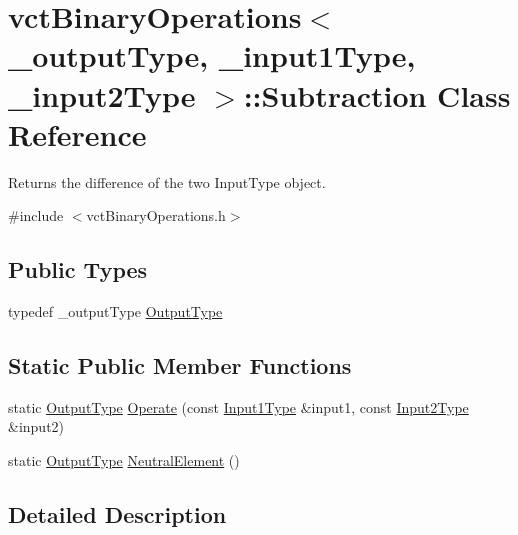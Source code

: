\hypertarget{classvct_binary_operations_1_1_subtraction}{}\section{vct\+Binary\+Operations$<$ \+\_\+output\+Type, \+\_\+input1\+Type, \+\_\+input2\+Type $>$\+:\+:Subtraction Class Reference}
\label{classvct_binary_operations_1_1_subtraction}


Returns the difference of the two Input\+Type object.  




{\ttfamily \#include $<$vct\+Binary\+Operations.\+h$>$}

\subsection*{Public Types}
\begin{DoxyCompactItemize}
\item 
typedef \+\_\+output\+Type \hyperlink{classvct_binary_operations_1_1_subtraction_acdf0aa04f6b08e9b6d199035f89071ff}{Output\+Type}
\end{DoxyCompactItemize}
\subsection*{Static Public Member Functions}
\begin{DoxyCompactItemize}
\item 
static \hyperlink{classvct_binary_operations_1_1_subtraction_acdf0aa04f6b08e9b6d199035f89071ff}{Output\+Type} \hyperlink{classvct_binary_operations_1_1_subtraction_a264fe1bd3f777894e0a50cf145b2df6d}{Operate} (const \hyperlink{classvct_binary_operations_a5e56a66a012d6a28c539a08a0021c45e}{Input1\+Type} \&input1, const \hyperlink{classvct_binary_operations_a929119af557a04a16b4d854981e49e1b}{Input2\+Type} \&input2)
\item 
static \hyperlink{classvct_binary_operations_1_1_subtraction_acdf0aa04f6b08e9b6d199035f89071ff}{Output\+Type} \hyperlink{classvct_binary_operations_1_1_subtraction_a6fa58511ec33d3d452708dc8b90300a3}{Neutral\+Element} ()
\end{DoxyCompactItemize}


\subsection{Detailed Description}
